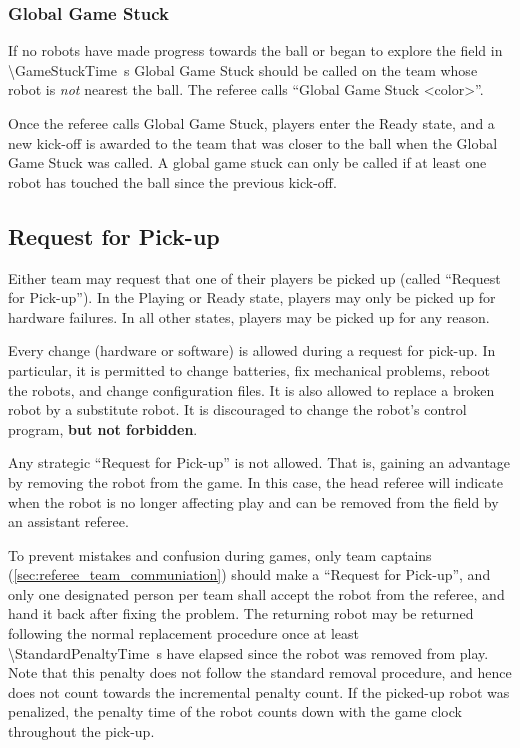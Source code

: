 \subsubsection{Global Game Stuck}
\label{sec:game_stuck:global}

If no robots have made progress towards the ball or began to explore the field in \qty{\GameStuckTime}{\second} Global Game Stuck should be called on the team whose robot is \textit{not} nearest the ball.
The referee calls ``Global Game Stuck \textless color\textgreater''.

Once the referee calls Global Game Stuck, players enter the Ready state, and a new kick-off is awarded to the team that was closer to the ball when the Global Game Stuck was called. A global game stuck can only be called if at least one robot has touched the ball since the previous kick-off.

\subsection{Request for Pick-up}
\label{sec:request_for_pickup}

Either team may request that one of their players be picked up (called ``Request for Pick-up'').
In the Playing or Ready state, players may only be picked up for hardware failures.
In all other states, players may be picked up for any reason.

Every change (hardware or software) is allowed during a request for pick-up. In particular,
it is permitted to change batteries, fix mechanical problems, reboot the robots, and change configuration files.
It is also allowed to replace a broken robot by a substitute robot.
It is discouraged to change the robot's control program, \textbf{but not forbidden}.

Any strategic ``Request for Pick-up'' is not allowed.
That is, gaining an advantage by removing the robot from the game.
In this case, the head referee will indicate when the robot is no longer affecting play and can be removed from the field by an assistant referee.

To prevent mistakes and confusion during games, only team captains (\cf \cref{sec:referee_team_communiation}) should make a ``Request for Pick-up'', and only one designated person per team shall accept the robot from the referee, and hand it back after fixing the problem.
The returning robot may be returned following the normal replacement procedure once at least \qty{\StandardPenaltyTime}{\second} have elapsed since the robot was removed from play.
Note that this penalty does not follow the standard removal procedure, and hence does not count towards the incremental penalty count.
If the picked-up robot was penalized, the penalty time of the robot counts down with the game clock throughout the pick-up.

